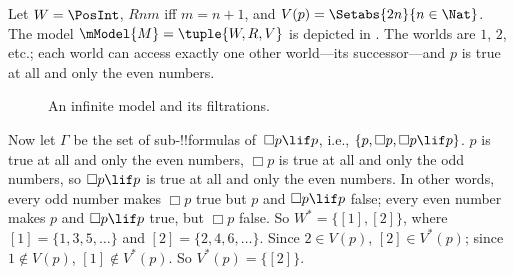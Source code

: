 \documentclass[../../../include/open-logic-section]{subfiles}
\begin{document}
\begin{ex}
  Let $W = \PosInt$, $Rnm$ iff $m = n + 1$, and $V(p) = \Setabs{2n}{n \in
    \Nat}$. The model $\mModel{M} = \tuple{W, R, V}$ is depicted in
  . The worlds are $1$, $2$, etc.; each
  world can access exactly one other world---its successor---and $p$ is
  true at all and only the even numbers.

  \begin{figure}
    \centering

    \caption{An infinite model and its filtrations.}
  \end{figure}
  
  Now let $\Gamma$ be the set of sub-!!{formula}s of~$\Box p \lif p$,
  i.e., $\{p, \Box p, \Box p \lif p\}$. $p$ is true at all and only
  the even numbers, $\Box p$ is true at all and only the odd numbers,
  so $\Box p \lif p$ is true at all and only the even numbers. In
  other words, every odd number makes $\Box p$ true but $p$ and $\Box
  p \lif p$ false; every even number makes $p$ and $\Box p \lif p$
  true, but $\Box p$ false. So $W^* = \{ [1], [2] \}$, where $[1] =
  \{1, 3, 5, \dots\}$ and $[2] = \{2, 4, 6, \dots\}$. Since $2 \in
  V(p)$, $[2] \in V^*(p)$; since $1 \notin V(p)$, $[1] \notin
  V^*(p)$. So $V^*(p) = \{[2]\}$.


\end{ex}
\end{document}
